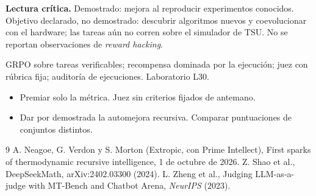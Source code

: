 \documentclass[11pt,a4paper]{article}
\begin{document}
\textbf{Lectura crítica.} Demostrado: mejora al reproducir experimentos conocidos. Objetivo declarado, no demostrado: descubrir algoritmos nuevos y coevolucionar con el
hardware; las tareas aún no corren sobre el simulador de TSU. No se reportan observaciones de \emph{reward hacking}.

\begin{aplicacion}
GRPO sobre tareas verificables; recompensa dominada por la ejecución; juez con rúbrica fija; auditoría de ejecuciones. Laboratorio L30.
\end{aplicacion}

\begin{error}
\begin{itemize}[nosep]
\item Premiar solo la métrica. \quad Juez sin criterios fijados de antemano.
\item Dar por demostrada la automejora recursiva. \quad Comparar puntuaciones de conjuntos distintos.
\end{itemize}
\end{error}

\begin{thebibliography}{9}\small
{} A. Neagoe, G. Verdon y S. Morton (Extropic, con Prime Intellect), First sparks of thermodynamic recursive intelligence, 1 de octubre de 2026.
 Z. Shao et al., DeepSeekMath, arXiv:2402.03300 (2024).
 L. Zheng et al., Judging LLM-as-a-judge with MT-Bench and Chatbot Arena, \emph{NeurIPS} (2023).
\end{thebibliography}
\end{document}
